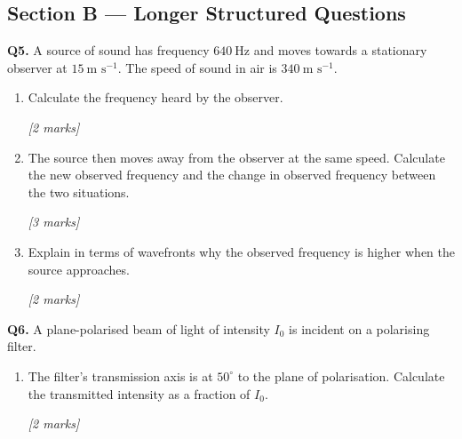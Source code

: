\pagebreak

\subsection*{Section B --- Longer Structured Questions}

\begin{tcolorbox}[colback=white, colframe=midblue, breakable]

\begin{minipage}{\linewidth}
\textbf{Q5.} A source of sound has frequency $640\ \text{Hz}$ and moves towards a stationary observer at $15\ \text{m s}^{-1}$. The speed of sound in air is $340\ \text{m s}^{-1}$.
\end{minipage}

\begin{enumerate}[label=(\alph*)]
  \item \begin{minipage}[t]{\linewidth}
  Calculate the frequency heard by the observer.
  \par\hfill\textit{[2 marks]}
  \vspace{3cm}
  \end{minipage}

  \item \begin{minipage}[t]{\linewidth}
  The source then moves away from the observer at the same speed. Calculate the new observed frequency and the change in observed frequency between the two situations.
  \par\hfill\textit{[3 marks]}
  \vspace{3.5cm}
  \end{minipage}

  \item \begin{minipage}[t]{\linewidth}
  Explain in terms of wavefronts why the observed frequency is higher when the source approaches.
  \par\hfill\textit{[2 marks]}
  \vspace{3cm}
  \end{minipage}
\end{enumerate}

\begin{minipage}{\linewidth}
\textbf{Q6.} A plane-polarised beam of light of intensity $I_0$ is incident on a polarising filter.

\begin{enumerate}[label=(\alph*)]
  \item The filter's transmission axis is at $50^\circ$ to the plane of polarisation. Calculate the transmitted intensity as a fraction of $I_0$.
  \par\hfill\textit{[2 marks]}
  \vspace{3cm}


\end{enumerate}
\end{minipage}
\end{tcolorbox}
